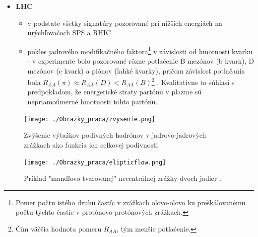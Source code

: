 \documentclass[thesismargins, thesislinespacing]{rnthesis}
\begin{document}
\begin{itemize}
	\item \textbf{LHC}
	\begin{itemize}
		\item v podstate všetky signatúry pozorované pri nižších energiách na urýchľovačoch SPS a RHIC
		\item pokles jadrového modifikačného faktora\footnote{Pomer počtu istého druhu častíc v zrážkach olovo-olovo ku preškálovanému počtu týchto častíc v protónovo-protónových zrážkach.} v závislosti od hmotnosti kvarku - v experimente bolo pozorované rôzne potlačenie B mezónov (b kvark), D mezónov (c kvark) a piónov (ľahké kvarky), pričom závislosť potlačania bola $R_{AA}(\pi)\approx R_{AA} (D)<R_{AA}(B)$\footnote{Čím väčšia hodnota pomeru $R_{AA}$, tým menšie potlačenie.} \cite{RAA}. Kvalitatívne to súhlasí s predpokladom, že energetické straty partónu v plazme sú nepriamoúmerné hmotnosti tohto partónu. 
		
	\end{itemize}
\end{itemize}

\begin{figure}[hbtp!]
	\begin{center}
		\texttt{[image: ./Obrazky\_praca/zvysenie.png]}
		\caption{ Zvýšenie výťažkov podivných hadrónov v jadrovo-jadrových zrážkach ako funkcia ich celkovej podivnosti \cite{zvysenie}}
		\label{zvysenie}
	\end{center}
\end{figure}  

\begin{figure}[hbtp!]
	\begin{center}
		\texttt{[image: ./Obrazky\_praca/elipticflow.png]}
		\caption{ Príklad "mandľovo tvarovanej" necentrálnej zrážky dvoch jadier \cite{elflow}.}
		\label{elflow}
	\end{center}
\end{figure}  
\end{document}
